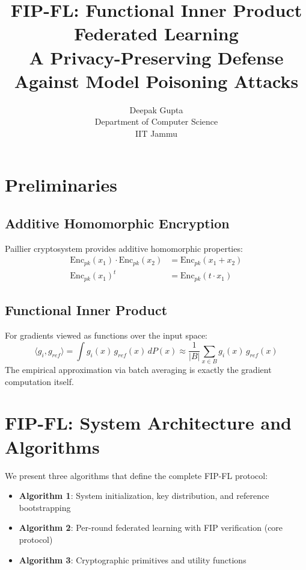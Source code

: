 \documentclass[10pt,journal,compsoc]{IEEEtran}
\begin{document}
\title{FIP-FL: Functional Inner Product Federated Learning \\ 
\large{A Privacy-Preserving Defense Against Model Poisoning Attacks}}

\author{Deepak Gupta\\Department of Computer Science\\IIT Jammu}

\maketitle

\section{Preliminaries}
\label{sec:prelim}

\subsection{Additive Homomorphic Encryption}
Paillier cryptosystem provides additive homomorphic properties:
\begin{align}
    \text{Enc}_{pk}(x_1) \cdot \text{Enc}_{pk}(x_2) &= \text{Enc}_{pk}(x_1 + x_2) \\
    \text{Enc}_{pk}(x_1)^t &= \text{Enc}_{pk}(t \cdot x_1)
\end{align}

\subsection{Functional Inner Product}
For gradients viewed as functions over the input space:
\begin{equation}
    \langle g_i, g_{ref} \rangle = \int g_i(x) \, g_{ref}(x) \, dP(x) \approx \frac{1}{|B|} \sum_{x \in B} g_i(x) \, g_{ref}(x)
\end{equation}
The empirical approximation via batch averaging is exactly the gradient computation itself.

\section{FIP-FL: System Architecture and Algorithms}
\label{sec:algorithms}

We present three algorithms that define the complete FIP-FL protocol:
\begin{itemize}
    \item \textbf{Algorithm 1}: System initialization, key distribution, and reference bootstrapping
    \item \textbf{Algorithm 2}: Per-round federated learning with FIP verification (core protocol)
    \item \textbf{Algorithm 3}: Cryptographic primitives and utility functions
\end{itemize}
\end{document}
